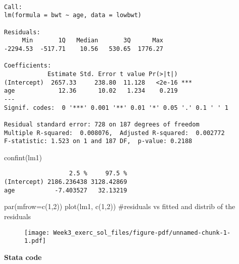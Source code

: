 \documentclass[
  letterpaper,
  DIV=11,
  numbers=noendperiod]{scrreprt}
\newenvironment{Shaded}{\begin{snugshade}}{\end{snugshade}}
\newcommand{\AttributeTok}[1]{\textcolor[rgb]{0.40,0.45,0.13}{#1}}
\newcommand{\CommentTok}[1]{\textcolor[rgb]{0.37,0.37,0.37}{#1}}
\newcommand{\DecValTok}[1]{\textcolor[rgb]{0.68,0.00,0.00}{#1}}
\newcommand{\FunctionTok}[1]{\textcolor[rgb]{0.28,0.35,0.67}{#1}}
\newcommand{\NormalTok}[1]{\textcolor[rgb]{0.00,0.23,0.31}{#1}}
\begin{document}
\begin{verbatim}

Call:
lm(formula = bwt ~ age, data = lowbwt)

Residuals:
     Min       1Q   Median       3Q      Max 
-2294.53  -517.71    10.56   530.65  1776.27 

Coefficients:
            Estimate Std. Error t value Pr(>|t|)    
(Intercept)  2657.33     238.80  11.128   <2e-16 ***
age            12.36      10.02   1.234    0.219    
---
Signif. codes:  0 '***' 0.001 '**' 0.01 '*' 0.05 '.' 0.1 ' ' 1

Residual standard error: 728 on 187 degrees of freedom
Multiple R-squared:  0.008076,  Adjusted R-squared:  0.002772 
F-statistic: 1.523 on 1 and 187 DF,  p-value: 0.2188
\end{verbatim}

\begin{Shaded}
\begin{Highlighting}[]
\FunctionTok{confint}\NormalTok{(lm1)}
\end{Highlighting}
\end{Shaded}

\begin{verbatim}
                  2.5 %     97.5 %
(Intercept) 2186.236438 3128.42869
age           -7.403527   32.13219
\end{verbatim}

\begin{Shaded}
\begin{Highlighting}[]
\FunctionTok{par}\NormalTok{(}\AttributeTok{mfrow=}\FunctionTok{c}\NormalTok{(}\DecValTok{1}\NormalTok{,}\DecValTok{2}\NormalTok{))}
\FunctionTok{plot}\NormalTok{(lm1, }\FunctionTok{c}\NormalTok{(}\DecValTok{1}\NormalTok{,}\DecValTok{2}\NormalTok{)) }\CommentTok{\#residuals vs fitted and distrib of the residuals}
\end{Highlighting}
\end{Shaded}

\begin{figure}[H]

{\centering \texttt{[image: Week3\_exerc\_sol\_files/figure-pdf/unnamed-chunk-1-1.pdf]}

}

\end{figure}

\textbf{Stata code}
\end{document}
